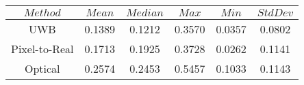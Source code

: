 \begin{table}[h]
\centering
\begin{tabular}{|c|c|c|c|c|c|}
\hline
$Method$ & $Mean$ & $Median$ & $Max$ & $Min$ & $StdDev$ \\
\hline
UWB & 0.1389 & 0.1212 & 0.3570 & 0.0357 & 0.0802 \\
\hline
Pixel-to-Real & 0.1713 & 0.1925 & 0.3728 & 0.0262 & 0.1141 \\
\hline
Optical & 0.2574 & 0.2453 & 0.5457 & 0.1033 & 0.1143 \\
\hline
\end{tabular}
\end{table}
